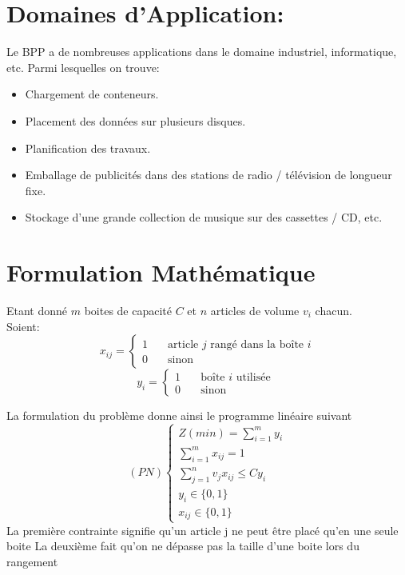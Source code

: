 \documentclass[class=report, crop=false]{standalone}
\begin{document}
    \section{Domaines d'Application:}
Le BPP a de nombreuses applications dans le domaine industriel, informatique, etc. Parmi lesquelles on trouve:
    \renewcommand{\labelitemi}{$\circ$}  
    \begin{itemize}
        \item Chargement de conteneurs.
        \item Placement des données sur plusieurs disques.
        \item Planification des travaux.
        \item Emballage de publicités dans des stations de radio / télévision de longueur fixe.
        \item Stockage d’une grande collection de musique sur des cassettes / CD, etc.
    \end{itemize}
    \section{Formulation Mathématique}
    Etant donné \(m\) boites de capacité \(C\) et \(n\) articles de volume \(v_i\) chacun. \\
    Soient: 
    \[ x_{ij} =
        \begin{cases}
            1  & \quad \text{article } j \text{ rangé dans la boîte } i \\
            0  & \quad \text{sinon } 
        \end{cases}
    \]
\[ y_i =
    \begin{cases}
        1  & \quad \text{boîte } i \text{ utilisée } \\
        0  & \quad \text{sinon } 
    \end{cases}
\]

La formulation du problème donne ainsi le programme linéaire suivant
\[(PN)
    \begin{cases}
        Z(min) = \displaystyle\sum_{i=1}^{m} y_i \\
        \displaystyle\sum_{i=1}^{m} x_{ij}  = 1 \\
        \displaystyle\sum_{j=1}^{n} v_j x_{ij} \le C y_i \\
        y_i \in \{0,1\} \\
        x_{ij} \in \{0,1\} 
    \end{cases}
\]  
La première contrainte signifie qu’un article j ne peut être placé qu’en une seule boite
La deuxième fait qu’on ne dépasse pas la taille d’une boite lors du rangement
\end{document}
